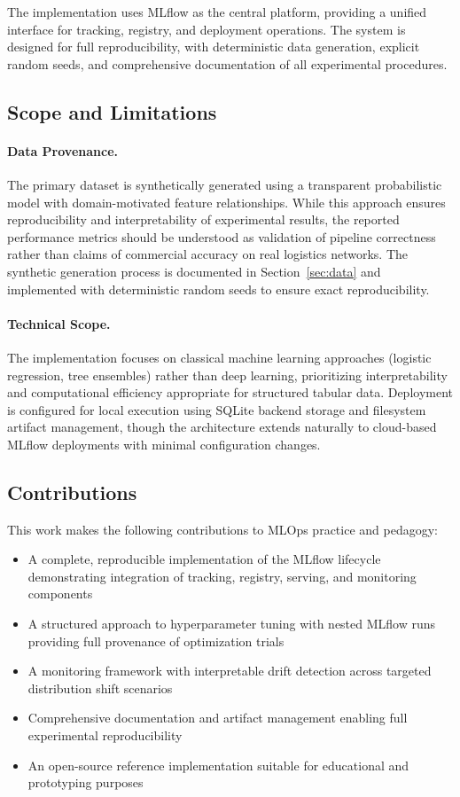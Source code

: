 \documentclass[11pt,a4paper]{article}
\begin{document}
The implementation uses MLflow as the central platform, providing a unified interface for tracking, registry, and deployment operations. The system is designed for full reproducibility, with deterministic data generation, explicit random seeds, and comprehensive documentation of all experimental procedures.

\subsection{Scope and Limitations}

\paragraph{Data Provenance.}
The primary dataset is synthetically generated using a transparent probabilistic model with domain-motivated feature relationships. While this approach ensures reproducibility and interpretability of experimental results, the reported performance metrics should be understood as validation of pipeline correctness rather than claims of commercial accuracy on real logistics networks. The synthetic generation process is documented in Section~\ref{sec:data} and implemented with deterministic random seeds to ensure exact reproducibility.

\paragraph{Technical Scope.}
The implementation focuses on classical machine learning approaches (logistic regression, tree ensembles) rather than deep learning, prioritizing interpretability and computational efficiency appropriate for structured tabular data. Deployment is configured for local execution using SQLite backend storage and filesystem artifact management, though the architecture extends naturally to cloud-based MLflow deployments with minimal configuration changes.

\subsection{Contributions}

This work makes the following contributions to MLOps practice and pedagogy:

\begin{itemize}
    \item A complete, reproducible implementation of the MLflow lifecycle demonstrating integration of tracking, registry, serving, and monitoring components
    \item A structured approach to hyperparameter tuning with nested MLflow runs providing full provenance of optimization trials
    \item A monitoring framework with interpretable drift detection across targeted distribution shift scenarios
    \item Comprehensive documentation and artifact management enabling full experimental reproducibility
    \item An open-source reference implementation suitable for educational and prototyping purposes
\end{itemize}
\end{document}
